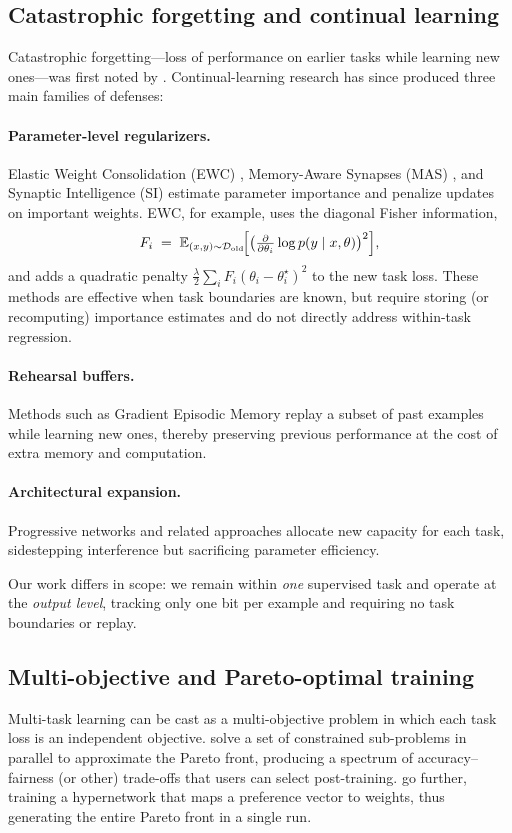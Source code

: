 \documentclass[12pt, letterpaper]{article}
\theoremstyle{remark}
\begin{document}
\subsection{Catastrophic forgetting and continual learning}
Catastrophic forgetting—loss of performance on earlier tasks while learning new ones—was first
noted by \citet{french1999catastrophic}.  Continual-learning research has since produced three main
families of defenses:

\paragraph{Parameter-level regularizers.}
Elastic Weight Consolidation (EWC) \citep{kirkpatrick2017overcoming}, Memory-Aware Synapses (MAS)
\citep{zenke2017continual}, and Synaptic Intelligence (SI) \citep{zenke2017continual} estimate
parameter importance and penalize updates on important weights.  
EWC, for example, uses the diagonal Fisher information,
\[
F_i \;=\; \mathbb{E}_{(x,y)\sim\mathcal{D}_{\text{old}}}
       \!\Bigl[\bigl(\tfrac{\partial}{\partial\theta_i}\log p(y\mid x,\theta)\bigr)^2\Bigr],
\]
and adds a quadratic penalty
\(
\frac{\lambda}{2}\sum_i F_i(\theta_i-\theta_i^\star)^2
\)
to the new task loss.  
These methods are effective when task boundaries are known, but require storing (or
recomputing) importance estimates and do not directly address within-task regression.

\paragraph{Rehearsal buffers.}
Methods such as Gradient Episodic Memory \citep{lopez2017gradient} replay a subset of past
examples while learning new ones, thereby preserving previous performance at the cost of extra
memory and computation.

\paragraph{Architectural expansion.}
Progressive networks \citep{rusu2016progressive} and related approaches allocate new capacity for
each task, sidestepping interference but sacrificing parameter efficiency.

Our work differs in scope: we remain within \emph{one} supervised task and operate at the \emph{output level}, tracking only one bit per example and requiring no task boundaries or replay.

\subsection{Multi-objective and Pareto-optimal training}
Multi-task learning can be cast as a multi-objective problem in which each task loss is an independent objective. \citet{lin2019pareto} solve a set of constrained sub-problems in parallel to approximate the Pareto front, producing a spectrum of accuracy–fairness (or other) trade-offs that users can select
post-training. \citet{navon2021learning} go further, training a hypernetwork that maps a preference vector to weights, thus generating the entire Pareto front in a single run.
\end{document}
